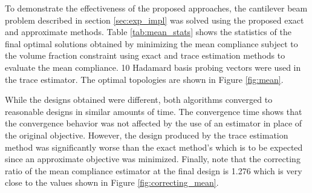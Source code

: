 To demonstrate the effectiveness of the proposed approaches, the cantilever beam problem described in section \ref{sec:exp_impl} was solved using the proposed exact and approximate methods. Table \ref{tab:mean_stats} shows the statistics of the final optimal solutions obtained by minimizing the mean compliance subject to the volume fraction constraint using exact and trace estimation methods to evaluate the mean compliance. 10 Hadamard basis probing vectors were used in the trace estimator. The optimal topologies are shown in Figure \ref{fig:mean}.

While the designs obtained were different, both algorithms converged to reasonable designs in similar amounts of time. The convergence time shows that the convergence behavior was not affected by the use of an estimator in place of the original objective. However, the design produced by the trace estimation method was significantly worse than the exact method's which is to be expected since an approximate objective was minimized. Finally, note that the correcting ratio of the mean compliance estimator at the final design is 1.276 which is very close to the values shown in Figure \ref{fig:correcting_mean}.

